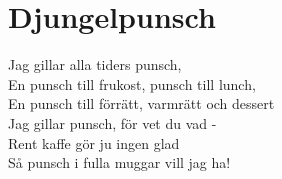 \section{Djungelpunsch}
Jag gillar alla tiders punsch,\\
En punsch till frukost, punsch till lunch,\\
En punsch till förrätt, varmrätt och dessert\\
Jag gillar punsch, för vet du vad -\\
Rent kaffe gör ju ingen glad\\
Så punsch i fulla muggar vill jag ha!\\